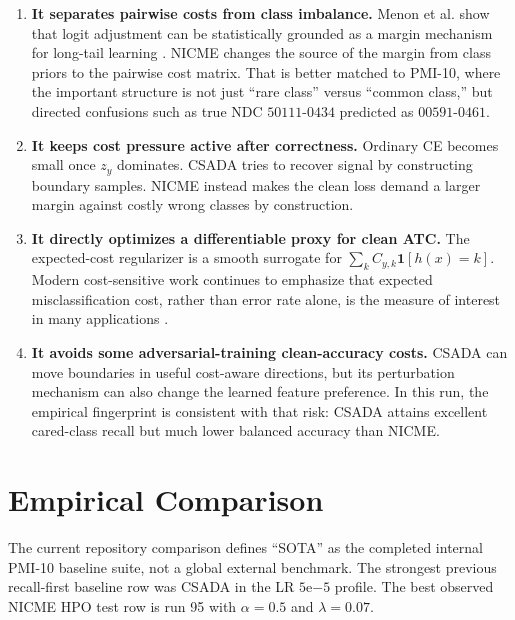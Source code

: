 \documentclass[11pt]{article}
\newcommand{\I}{\mathbf{1}}
\theoremstyle{definition}
\theoremstyle{plain}
\theoremstyle{remark}
\begin{document}
\begin{enumerate}
  \item \textbf{It separates pairwise costs from class imbalance.}
  Menon et al. show that logit adjustment can be statistically grounded as a margin mechanism for long-tail learning \cite{menon2021logit}.
  NICME changes the source of the margin from class priors to the pairwise cost matrix.
  That is better matched to PMI-10, where the important structure is not just ``rare class'' versus ``common class,'' but directed confusions such as true NDC $50111$-$0434$ predicted as $00591$-$0461$.
  \item \textbf{It keeps cost pressure active after correctness.}
  Ordinary CE becomes small once $z_y$ dominates.
  CSADA tries to recover signal by constructing boundary samples.
  NICME instead makes the clean loss demand a larger margin against costly wrong classes by construction.
  \item \textbf{It directly optimizes a differentiable proxy for clean ATC.}
  The expected-cost regularizer is a smooth surrogate for $\sum_k C_{y,k}\I[h(x)=k]$.
  Modern cost-sensitive work continues to emphasize that expected misclassification cost, rather than error rate alone, is the measure of interest in many applications \cite{komisarenko2025cost}.
  \item \textbf{It avoids some adversarial-training clean-accuracy costs.}
  CSADA can move boundaries in useful cost-aware directions, but its perturbation mechanism can also change the learned feature preference.
  In this run, the empirical fingerprint is consistent with that risk: CSADA attains excellent cared-class recall but much lower balanced accuracy than NICME.
\end{enumerate}

\section{Empirical Comparison}

The current repository comparison defines ``SOTA'' as the completed internal PMI-10 baseline suite, not a global external benchmark.
The strongest previous recall-first baseline row was CSADA in the LR $5\mathrm{e}{-5}$ profile.
The best observed NICME HPO test row is run 95 with $\alpha=0.5$ and $\lambda=0.07$.
\end{document}
